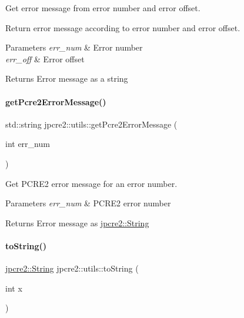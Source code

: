 Get error message from error number and error offset. 

Return error message according to error number and error offset.


\begin{DoxyParams}{Parameters}
{\em err\+\_\+num} & Error number \\
\hline
{\em err\+\_\+off} & Error offset \\
\hline
\end{DoxyParams}
\begin{DoxyReturn}{Returns}
Error message as a string 
\end{DoxyReturn}
\hypertarget{namespacejpcre2_1_1utils_a6f28489b48095eeaacfaa43a0a8e87a6_a6f28489b48095eeaacfaa43a0a8e87a6}{}\label{namespacejpcre2_1_1utils_a6f28489b48095eeaacfaa43a0a8e87a6_a6f28489b48095eeaacfaa43a0a8e87a6} 
\paragraph{\texorpdfstring{get\+Pcre2\+Error\+Message()}{getPcre2ErrorMessage()}}
{\footnotesize\ttfamily std\+::string jpcre2\+::utils\+::get\+Pcre2\+Error\+Message (\begin{DoxyParamCaption}\item[{int}]{err\+\_\+num }\end{DoxyParamCaption})}



Get P\+C\+R\+E2 error message for an error number. 


\begin{DoxyParams}{Parameters}
{\em err\+\_\+num} & P\+C\+R\+E2 error number \\
\hline
\end{DoxyParams}
\begin{DoxyReturn}{Returns}
Error message as \hyperlink{namespacejpcre2_a91f03070152fb228bc116c5a737f1d16}{jpcre2\+::\+String} 
\end{DoxyReturn}
\hypertarget{namespacejpcre2_1_1utils_a3603a3493202e7408e18fd0a912bf725_a3603a3493202e7408e18fd0a912bf725}{}\label{namespacejpcre2_1_1utils_a3603a3493202e7408e18fd0a912bf725_a3603a3493202e7408e18fd0a912bf725} 
\paragraph{\texorpdfstring{to\+String()}{toString()}\hspace{0.1cm}{\footnotesize\ttfamily [1/4]}}
{\footnotesize\ttfamily \hyperlink{namespacejpcre2_a91f03070152fb228bc116c5a737f1d16}{jpcre2\+::\+String} jpcre2\+::utils\+::to\+String (\begin{DoxyParamCaption}\item[{int}]{x }\end{DoxyParamCaption})}



